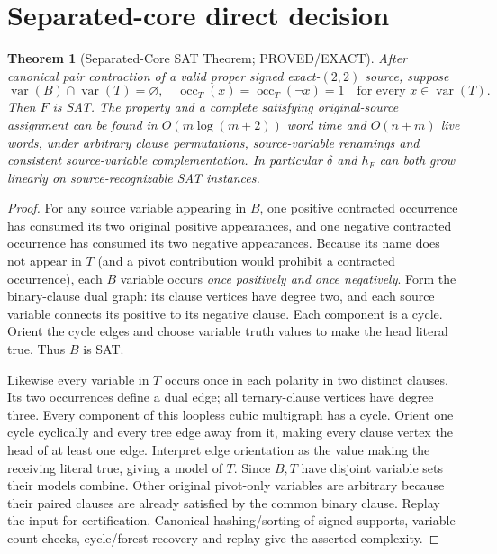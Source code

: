 \documentclass[11pt]{article}
\newtheorem{theorem}{Theorem}
\begin{document}
\section{Separated-core direct decision}
\begin{theorem}[Separated-Core SAT Theorem; PROVED/EXACT]
After canonical pair contraction of a valid proper signed exact-$(2,2)$ source, suppose
\[
\operatorname{var}(B)\cap\operatorname{var}(T)=\varnothing,\quad
\operatorname{occ}_{T}(x)=\operatorname{occ}_{T}(\neg x)=1
\quad\text{for every }x\in\operatorname{var}(T).
\]
Then $F$ is SAT. The property and a complete satisfying original-source assignment can be found in $O(m\log(m+2))$ word time and $O(n+m)$ live words, under arbitrary clause permutations, source-variable renamings and consistent source-variable complementation. In particular $\delta$ and $h_F$ can both grow linearly on source-recognizable SAT instances.
\end{theorem}
\begin{proof}
For any source variable appearing in $B$, one positive contracted occurrence has consumed its two original positive appearances, and one negative contracted occurrence has consumed its two negative appearances. Because its name does not appear in $T$ (and a pivot contribution would prohibit a contracted occurrence), each $B$ variable occurs \emph{once positively and once negatively}. Form the binary-clause dual graph: its clause vertices have degree two, and each source variable connects its positive to its negative clause. Each component is a cycle. Orient the cycle edges and choose variable truth values to make the head literal true. Thus $B$ is SAT.

Likewise every variable in $T$ occurs once in each polarity in two distinct clauses. Its two occurrences define a dual edge; all ternary-clause vertices have degree three. Every component of this loopless cubic multigraph has a cycle. Orient one cycle cyclically and every tree edge away from it, making every clause vertex the head of at least one edge. Interpret edge orientation as the value making the receiving literal true, giving a model of $T$. Since $B,T$ have disjoint variable sets their models combine. Other original pivot-only variables are arbitrary because their paired clauses are already satisfied by the common binary clause. Replay the input for certification. Canonical hashing/sorting of signed supports, variable-count checks, cycle/forest recovery and replay give the asserted complexity.
\end{proof}
\end{document}
